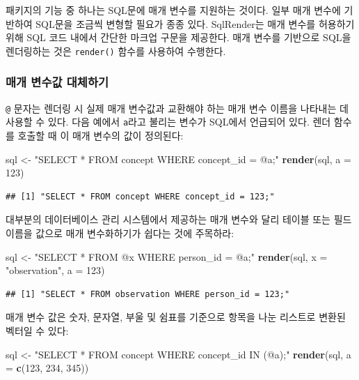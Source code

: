 \documentclass[11pt]{book}
\newenvironment{Shaded}{\begin{snugshade}}{\end{snugshade}}
\newcommand{\KeywordTok}[1]{\textcolor[rgb]{0.13,0.29,0.53}{\textbf{#1}}}
\newcommand{\DataTypeTok}[1]{\textcolor[rgb]{0.13,0.29,0.53}{#1}}
\newcommand{\DecValTok}[1]{\textcolor[rgb]{0.00,0.00,0.81}{#1}}
\newcommand{\StringTok}[1]{\textcolor[rgb]{0.31,0.60,0.02}{#1}}
\newcommand{\NormalTok}[1]{#1}
\theoremstyle{definition}
\theoremstyle{definition}
\theoremstyle{definition}
\theoremstyle{remark}
\begin{document}
패키지의 기능 중 하나는 SQL문에 매개 변수를 지원하는 것이다. 일부 매개
변수에 기반하여 SQL문을 조금씩 변형할 필요가 종종 있다. SqlRender는 매개
변수를 허용하기 위해 SQL 코드 내에서 간단한 마크업 구문을 제공한다. 매개
변수를 기반으로 SQL을 렌더링하는 것은 \texttt{render()} 함수를 사용하여
수행한다. 

\subsubsection*{매개 변수값 대체하기}\label{--}

\texttt{@} 문자는 렌더링 시 실제 매개 변수값과 교환해야 하는 매개 변수
이름을 나타내는 데 사용할 수 있다. 다음 예에서 \texttt{a}라고 불리는
변수가 SQL에서 언급되어 있다. 렌더 함수를 호출할 때 이 매개 변수의 값이
정의된다:

\begin{Shaded}
\begin{Highlighting}[]
\NormalTok{sql <-}\StringTok{ "SELECT * FROM concept WHERE concept_id = @a;"}
\KeywordTok{render}\NormalTok{(sql, }\DataTypeTok{a =} \DecValTok{123}\NormalTok{)}
\end{Highlighting}
\end{Shaded}

\begin{verbatim}
## [1] "SELECT * FROM concept WHERE concept_id = 123;"
\end{verbatim}

대부분의 데이터베이스 관리 시스템에서 제공하는 매개 변수와 달리 테이블
또는 필드 이름을 값으로 매개 변수화하기가 쉽다는 것에 주목하라:

\begin{Shaded}
\begin{Highlighting}[]
\NormalTok{sql <-}\StringTok{ "SELECT * FROM @x WHERE person_id = @a;"}
\KeywordTok{render}\NormalTok{(sql, }\DataTypeTok{x =} \StringTok{"observation"}\NormalTok{, }\DataTypeTok{a =} \DecValTok{123}\NormalTok{)}
\end{Highlighting}
\end{Shaded}

\begin{verbatim}
## [1] "SELECT * FROM observation WHERE person_id = 123;"
\end{verbatim}

매개 변수 값은 숫자, 문자열, 부울 및 쉼표를 기준으로 항목을 나눈
리스트로 변환된 벡터일 수 있다:

\begin{Shaded}
\begin{Highlighting}[]
\NormalTok{sql <-}\StringTok{ "SELECT * FROM concept WHERE concept_id IN (@a);"}
\KeywordTok{render}\NormalTok{(sql, }\DataTypeTok{a =} \KeywordTok{c}\NormalTok{(}\DecValTok{123}\NormalTok{, }\DecValTok{234}\NormalTok{, }\DecValTok{345}\NormalTok{))}
\end{Highlighting}
\end{Shaded}
\end{document}
